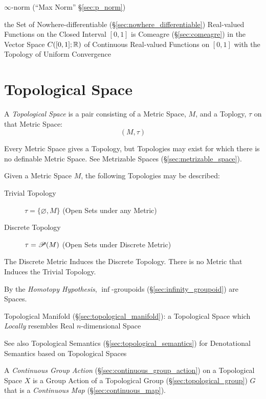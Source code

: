 $\infty$-norm (``Max Norm'' \S\ref{sec:p_norm})

the Set of Nowhere-differentiable (\S\ref{sec:nowhere_differentiable})
Real-valued Functions on the Closed Interval $[0,1]$ is Comeagre
(\S\ref{sec:comeagre}) in the Vector Space $C([0,1]; \mathbb{R})$ of Continuous
Real-valued Functions on $[0,1]$ with the Topology of Uniform Convergence



\section{Topological Space}\label{sec:topological_space}

A \emph{Topological Space} is a pair consisting of a Metric Space,
$M$, and a Toplogy, $\tau$ on that Metric Space:
\[
  (M,\tau)
\]

Every Metric Space gives a Topology, but Topologies may exist for
which there is no definable Metric Space. See Metrizable Spaces
(\S\ref{sec:metrizable_space}).

Given a Metric Space $M$, the following Topologies may be described:
\begin{description}
\item[Trivial Topology] $\tau = \{\varnothing, M\}$ (Open Sets under
  any Metric)

\item[Discrete Topology] $\tau = \mathscr{P}(M)$ (Open Sets under
  Discrete Metric)
\end{description}
The Discrete Metric Induces the Discrete Topology. There is no Metric
that Induces the Trivial Topology.

By the \emph{Homotopy Hypothesis}, $\inf$-groupoids
(\S\ref{sec:infinity_groupoid}) are Spaces.

\fist Topological Manifold (\S\ref{sec:topological_manifold}): a Topological
Space which \emph{Locally} resembles Real $n$-dimensional Space

\fist See also Topological Semantics
(\S\ref{sec:topological_semantics}) for Denotational Semantics based
on Topological Spaces

A \emph{Continuous Group Action} (\S\ref{sec:continuous_group_action}) on a
Topological Space $X$ is a Group Action of a Topological Group
(\S\ref{sec:topological_group}) $G$ that is a \emph{Continuous Map}
(\S\ref{sec:continuous_map}).



